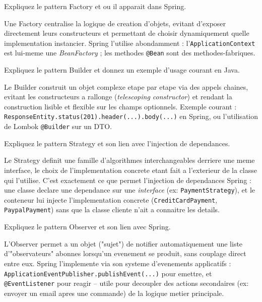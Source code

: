 \documentclass[11pt,a4paper]{article}
\begin{document}
\begin{question} Expliquez le pattern Factory et ou il apparait dans Spring.
\end{question}
\begin{reponse}
Une Factory centralise la logique de creation d'objets, evitant d'exposer directement leurs constructeurs et permettant de choisir dynamiquement quelle implementation instancier. Spring l'utilise abondamment : l'\texttt{ApplicationContext} est lui-meme une \emph{BeanFactory} ; les methodes \texttt{@Bean} sont des methodes-fabriques.
\end{reponse}

\begin{question} Expliquez le pattern Builder et donnez un exemple d'usage courant en Java.
\end{question}
\begin{reponse}
Le Builder construit un objet complexe etape par etape via des appels chaines, evitant les constructeurs a rallonge (\emph{telescoping constructor}) et rendant la construction lisible et flexible sur les champs optionnels. Exemple courant : \texttt{ResponseEntity.status(201).header(...).body(...)} en Spring, ou l'utilisation de Lombok \texttt{@Builder} sur un DTO.
\end{reponse}

\begin{question} Expliquez le pattern Strategy et son lien avec l'injection de dependances.
\end{question}
\begin{reponse}
Le Strategy definit une famille d'algorithmes interchangeables derriere une meme interface, le choix de l'implementation concrete etant fait a l'exterieur de la classe qui l'utilise. C'est exactement ce que permet l'injection de dependances Spring : une classe declare une dependance sur une \emph{interface} (ex: \texttt{PaymentStrategy}), et le conteneur lui injecte l'implementation concrete (\texttt{CreditCardPayment}, \texttt{PaypalPayment}) sans que la classe cliente n'ait a connaitre les details.
\end{reponse}

\begin{question} Expliquez le pattern Observer et son lien avec Spring.
\end{question}
\begin{reponse}
L'Observer permet a un objet ("sujet") de notifier automatiquement une liste d'"observateurs" abonnes lorsqu'un evenement se produit, sans couplage direct entre eux. Spring l'implemente via son systeme d'evenements applicatifs : \texttt{ApplicationEventPublisher.publishEvent(...)} pour emettre, et \texttt{@EventListener} pour reagir -- utile pour decoupler des actions secondaires (ex: envoyer un email apres une commande) de la logique metier principale.
\end{reponse}
\end{document}
